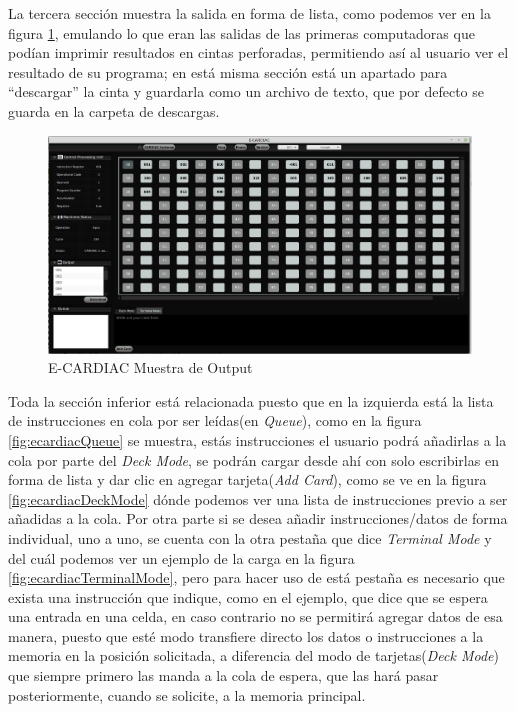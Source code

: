 \documentclass[letterpaper,12pt,oneside]{book}
\begin{document}
	La tercera sección muestra la salida en forma de lista, como podemos ver en la figura \ref{fig:ecardiacOutput}, emulando lo que eran las salidas de las primeras 
	computadoras que podían imprimir resultados
	en cintas perforadas, permitiendo así al usuario ver el resultado de su programa; en está misma sección está un apartado para ``descargar'' la cinta y guardarla
	como un archivo de texto, que por defecto se guarda en la carpeta de descargas.

	\begin{figure}[h]
 			\centering
			\includegraphics[scale=0.27]{media/ECARDIAC/OutputFullfilled.png}
			\caption{E-CARDIAC Muestra de Output}
			\label{fig:ecardiacOutput}
	\end{figure}
	
	Toda la sección inferior está relacionada puesto que en la izquierda está la lista de instrucciones en cola por ser leídas(en \textit{Queue}),
	como en la figura \ref{fig:ecardiacQueue} se muestra, estás instrucciones
	el usuario podrá añadirlas  a la cola por parte del \textit{Deck Mode}, se podrán cargar desde ahí con solo escribirlas
	en forma de lista y dar clic en agregar tarjeta(\textit{Add Card}), como se ve en la figura \ref{fig:ecardiacDeckMode} dónde podemos ver una
	lista de instrucciones previo a ser añadidas a la cola. Por otra parte si se desea añadir instrucciones/datos de forma individual, uno a uno, se cuenta
	con la otra pestaña que dice \textit{Terminal Mode} y del cuál podemos ver un ejemplo de la carga en la figura \ref{fig:ecardiacTerminalMode}, pero para hacer uso
	de está pestaña es necesario que exista una instrucción que indique, como en el ejemplo, que dice que se espera una entrada en una celda, en caso contrario
	no se permitirá agregar datos de esa manera, puesto que esté modo transfiere directo los datos o instrucciones a la memoria en la posición solicitada,
	a diferencia del modo de tarjetas(\textit{Deck Mode}) que siempre primero las manda a la cola de espera, que las hará pasar posteriormente, cuando se solicite,
	a la memoria principal.
\end{document}
